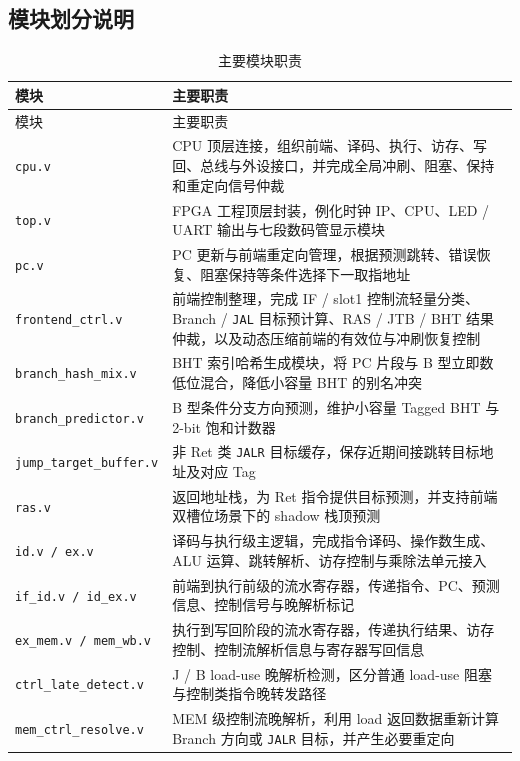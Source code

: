﻿\documentclass[12pt,a4paper]{ctexart}
\begin{document}
\subsection{模块划分说明}
\begin{longtable}{>{\raggedright\arraybackslash}p{}>{\raggedright\arraybackslash}p{}}
    \caption{主要模块职责} \\
    \toprule
    模块 & 主要职责 \\
    \midrule
    \endfirsthead
    \toprule
    模块 & 主要职责 \\
    \midrule
    \endhead
    \texttt{cpu.v} & CPU 顶层连接，组织前端、译码、执行、访存、写回、总线与外设接口，并完成全局冲刷、阻塞、保持和重定向信号仲裁 \\
    \texttt{top.v} & FPGA 工程顶层封装，例化时钟 IP、CPU、LED / UART 输出与七段数码管显示模块 \\
    \texttt{pc.v} & PC 更新与前端重定向管理，根据预测跳转、错误恢复、阻塞保持等条件选择下一取指地址 \\
    \texttt{frontend\_ctrl.v} & 前端控制整理，完成 IF / slot1 控制流轻量分类、Branch / \texttt{JAL} 目标预计算、RAS / JTB / BHT 结果仲裁，以及动态压缩前端的有效位与冲刷恢复控制 \\
    \texttt{branch\_hash\_mix.v} & BHT 索引哈希生成模块，将 PC 片段与 B 型立即数低位混合，降低小容量 BHT 的别名冲突 \\
    \texttt{branch\_predictor.v} & B 型条件分支方向预测，维护小容量 Tagged BHT 与 2-bit 饱和计数器 \\
    \texttt{jump\_target\_buffer.v} & 非 Ret 类 \texttt{JALR} 目标缓存，保存近期间接跳转目标地址及对应 Tag \\
    \texttt{ras.v} & 返回地址栈，为 Ret 指令提供目标预测，并支持前端双槽位场景下的 shadow 栈顶预测 \\
    \texttt{id.v / ex.v} & 译码与执行级主逻辑，完成指令译码、操作数生成、ALU 运算、跳转解析、访存控制与乘除法单元接入 \\
    \texttt{if\_id.v / id\_ex.v} & 前端到执行前级的流水寄存器，传递指令、PC、预测信息、控制信号与晚解析标记 \\
    \texttt{ex\_mem.v / mem\_wb.v} & 执行到写回阶段的流水寄存器，传递执行结果、访存控制、控制流解析信息与寄存器写回信息 \\
    \texttt{ctrl\_late\_detect.v} & J / B load-use 晚解析检测，区分普通 load-use 阻塞与控制类指令晚转发路径 \\
    \texttt{mem\_ctrl\_resolve.v} & MEM 级控制流晚解析，利用 load 返回数据重新计算 Branch 方向或 \texttt{JALR} 目标，并产生必要重定向 \\

\end{longtable}
\end{document}
